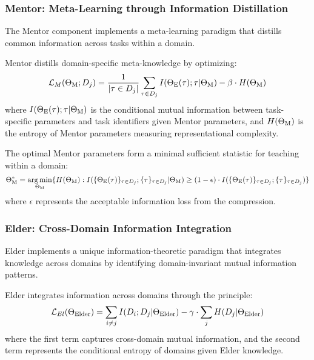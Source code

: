 \subsubsection{Mentor: Meta-Learning through Information Distillation}

The Mentor component implements a meta-learning paradigm that distills common information across tasks within a domain.

\begin{theorem}
Mentor distills domain-specific meta-knowledge by optimizing:
\begin{equation}
\mathcal{L}_M(\Theta_{\text{M}}; D_j) = \frac{1}{|\tau \in D_j|} \sum_{\tau \in D_j} I(\Theta_{\text{E}}(\tau); \tau | \Theta_{\text{M}}) - \beta \cdot H(\Theta_{\text{M}})
\end{equation}
where $I(\Theta_{\text{E}}(\tau); \tau | \Theta_{\text{M}})$ is the conditional mutual information between task-specific parameters and task identifiers given Mentor parameters, and $H(\Theta_{\text{M}})$ is the entropy of Mentor parameters measuring representational complexity.
\end{theorem}

\begin{proposition}
The optimal Mentor parameters form a minimal sufficient statistic for teaching within a domain:
\begin{equation}
\Theta_{\text{M}}^* = \mathop{\mathrm{arg\,min}}_{\Theta_{\text{M}}} \{ H(\Theta_{\text{M}}) : I(\{\Theta_{\text{E}}(\tau)\}_{\tau \in D_j}; \{\tau\}_{\tau \in D_j} | \Theta_{\text{M}}) \geq (1-\epsilon) \cdot I(\{\Theta_{\text{E}}(\tau)\}_{\tau \in D_j}; \{\tau\}_{\tau \in D_j}) \}
\end{equation}
where $\epsilon$ represents the acceptable information loss from the compression.
\end{proposition}

\subsubsection{Elder: Cross-Domain Information Integration}

Elder implements a unique information-theoretic paradigm that integrates knowledge across domains by identifying domain-invariant mutual information patterns.

\begin{theorem}
Elder integrates information across domains through the principle:
\begin{equation}
\mathcal{L}_{El}(\Theta_{\text{Elder}}) = \sum_{i \neq j} I(D_i; D_j | \Theta_{\text{Elder}}) - \gamma \cdot \sum_j H(D_j | \Theta_{\text{Elder}})
\end{equation}
where the first term captures cross-domain mutual information, and the second term represents the conditional entropy of domains given Elder knowledge.
\end{theorem}


